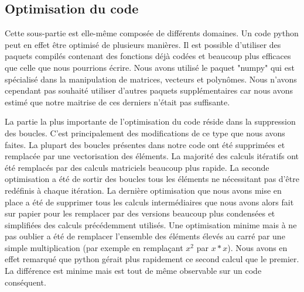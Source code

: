 \documentclass{article}
\begin{document}
	\subsection{Optimisation du code}
		Cette sous-partie est elle-même composée de différents domaines.
		Un code python peut en effet être optimisé de plusieurs manières.
		Il est possible d'utiliser des paquets compilés contenant des fonctions déjà codées et beaucoup plus efficaces que celle que nous pourrions écrire.
		Nous avons utilisé le paquet "numpy" qui est spécialisé dans la manipulation de matrices, vecteurs et polynômes.
		Nous n'avons cependant pas souhaité utiliser d'autres paquets supplémentaires car nous avons estimé que notre maitrise de ces derniers n'était pas suffisante.
		
		La partie la plus importante de l'optimisation du code réside dans la suppression des boucles. 
		C'est principalement des modifications de ce type que nous avons faites.
		La plupart des boucles présentes dans notre code ont été supprimées et remplacée par une vectorisation des éléments.
		La majorité des calculs itératifs ont été remplacés par des calculs matriciels beaucoup plus rapide.
		La seconde optimisation a été de sortir des boucles tous les éléments ne nécessitant pas d'être redéfinis à chaque itération.
		La dernière optimisation que nous avons mise en place a été de supprimer tous les calculs intermédiaires que nous avons alors fait sur papier pour les remplacer par des versions beaucoup plus condensées et simplifiées des calculs précédemment utilisés.
		Une optimisation minime mais à ne pas oublier a été de remplacer l'ensemble des éléments élevés au carré par une simple multiplication (par exemple en remplaçant $x^2$ par $x*x$).
		Nous avons en effet remarqué que python gérait plus rapidement ce second calcul que le premier.
		La différence est minime mais est tout de même observable sur un code conséquent.
\end{document}
